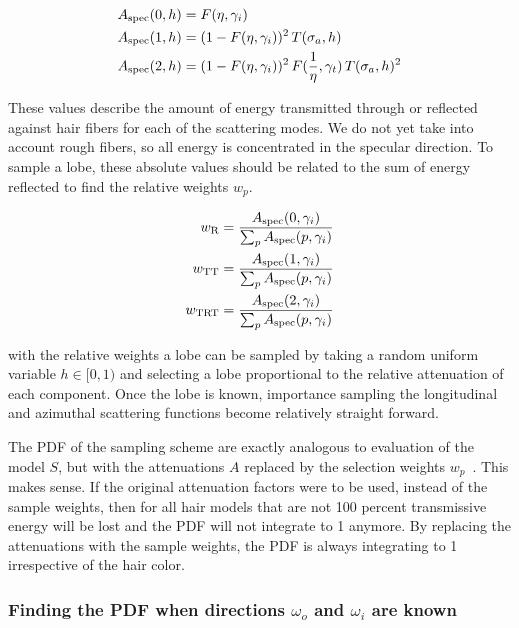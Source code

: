 \documentclass[11pt,a4paper]{report}
\begin{document}
\begin{align}
A_{\textnormal{spec}}(0, h) &= F(\eta, \gamma_i) \\
A_{\textnormal{spec}}(1, h) &= (1 - F(\eta, \gamma_i))^2 \, T(\sigma_a, h) \\
A_{\textnormal{spec}}(2, h) &= (1 - F(\eta, \gamma_i))^2 \, F(\frac{1}{\eta}, \gamma_t) \, T(\sigma_a, h)^2
\end{align}

These values describe the amount of energy transmitted through or reflected against hair fibers for each of the scattering modes. We do not yet take into account rough fibers, so all energy is concentrated in the specular direction. To sample a lobe, these absolute values should be related to the sum of energy reflected to find the relative weights $w_p$.

\begin{align}
w_{\textnormal{R}} &= \frac{A_{\textnormal{spec}}(0, \gamma_i)}{\sum_p A_{\textnormal{spec}}(p, \gamma_i)} \\
w_{\textnormal{TT}} &= \frac{A_{\textnormal{spec}}(1, \gamma_i)}{\sum_p A_{\textnormal{spec}}(p, \gamma_i)} \\
w_{\textnormal{TRT}} &= \frac{A_{\textnormal{spec}}(2, \gamma_i)}{\sum_p A_{\textnormal{spec}}(p, \gamma_i)}
\end{align}

with the relative weights a lobe can be sampled by taking a random uniform variable $h \in [0, 1)$ and selecting a lobe proportional to the relative attenuation of each component. Once the lobe is known, importance sampling the longitudinal and azimuthal scattering functions become relatively straight forward.

The PDF of the sampling scheme are exactly analogous to evaluation of the model $S$, but with the attenuations $A$ replaced by the selection weights $w_p$~\cite{eon2013}. This makes sense. If the original attenuation factors were to be used, instead of the sample weights, then for all hair models that are not 100 percent transmissive energy will be lost and the PDF will not integrate to 1 anymore. By replacing the attenuations with the sample weights, the PDF is always integrating to 1 irrespective of the hair color.


\subsubsection{Finding the PDF when directions $\omega_o$ and $\omega_i$ are known}
\end{document}
